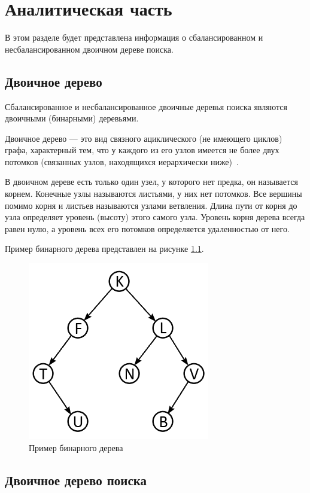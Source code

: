 \chapter{Аналитическая часть}
В этом разделе будет представлена информация о сбалансированном и несбалансированном двоичном дереве поиска.

\section{Двоичное дерево}

Сбалансированное и несбалансированное двоичные деревья поиска являются двоичными (бинарными) деревьями.

Двоичное дерево --- это вид связного ациклического (не имеющего циклов) графа, характерный тем, что у каждого из его узлов имеется не более двух потомков (связанных узлов, находящихся иерархически ниже)~\cite{algs}.

В двоичном дереве есть только один узел, у которого нет предка, он называется корнем.
Конечные узлы называются листьями, у них нет потомков.
Все вершины помимо корня и листьев называются узлами ветвления.
Длина пути от корня до узла определяет уровень (высоту) этого самого узла.
Уровень корня дерева всегда равен нулю, а уровень всех его потомков определяется удаленностью от него.

Пример бинарного дерева представлен на рисунке \ref{fig:binary_tree_example}.

\begin{figure}[h]
	\centering
	\includegraphics[height=0.3\textheight]{img/binary_tree.png}
	\caption{Пример бинарного дерева}
	\label{fig:binary_tree_example}
\end{figure}

\section{Двоичное дерево поиска}

